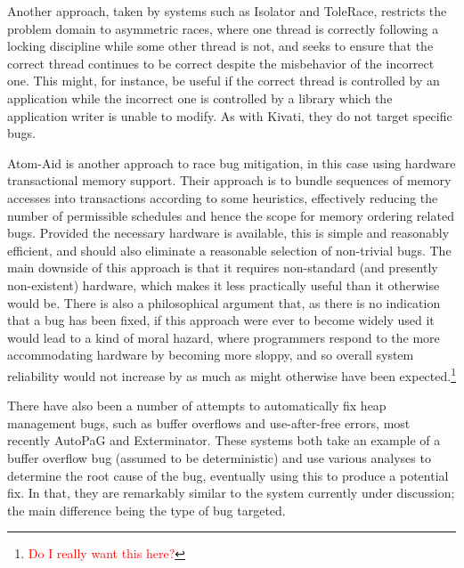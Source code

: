 \documentclass[10pt,twocolumn,preprint,natbib,authoryear]{sigplanconf}
\newcommand{\editorial}[1]{\textcolor{red}{\footnote{\textcolor{red}{#1}}}}
\begin{document}
Another approach, taken by systems such as
Isolator\cite{Ramalingam2009} and ToleRace\cite{Kirovski2007},
restricts the problem domain to asymmetric races, where one thread is
correctly following a locking discipline while some other thread is
not, and seeks to ensure that the correct thread continues to be
correct despite the misbehavior of the incorrect one.  This might,
for instance, be useful if the correct thread is controlled by an
application while the incorrect one is controlled by a library which
the application writer is unable to modify.  As with Kivati, they do
not target specific bugs.

Atom-Aid\cite{Lucia2009} is another approach to race bug
mitigation, in this case using hardware transactional memory support.
Their approach is to bundle sequences of memory accesses into
transactions according to some heuristics, effectively reducing the
number of permissible schedules and hence the scope for memory
ordering related bugs.  Provided the necessary hardware is available,
this is simple and reasonably efficient, and should also eliminate a
reasonable selection of non-trivial bugs.  The main downside of this
approach is that it requires non-standard (and presently non-existent)
hardware, which makes it less practically useful than it otherwise
would be.  There is also a philosophical argument that, as there is no
indication that a bug has been fixed, if this approach were ever to
become widely used it would lead to a kind of moral hazard, where
programmers respond to the more accommodating hardware by becoming
more sloppy, and so overall system reliability would not increase by
as much as might otherwise have been expected.\editorial{Do I really
  want this here?}

There have also been a number of attempts to automatically fix heap
management bugs, such as buffer overflows and use-after-free errors,
most recently AutoPaG\cite{Lin2007} and Exterminator\cite{Novark2007}.
These systems both take an example of a buffer overflow bug (assumed
to be deterministic) and use various analyses to determine the root
cause of the bug, eventually using this to produce a potential fix.
In that, they are remarkably similar to the system currently under
discussion; the main difference being the type of bug targeted.
\end{document}
